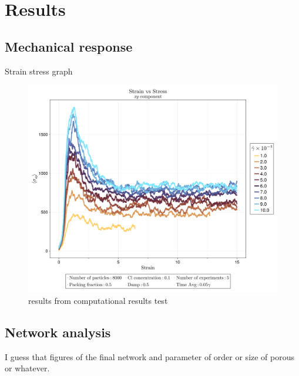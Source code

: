 \section{Results}

\subsection{Mechanical response}

Strain stress graph

\begin{figure}[ht!]
    \centering
    \includegraphics[width=\textwidth]{figs/ComputaitonalResults/strain-vs-stressxy.png}
    \caption{results from computational results test}
\end{figure}


\subsection{Network analysis}

I guess that figures of the final network and parameter of order or size of porous or whatever.

